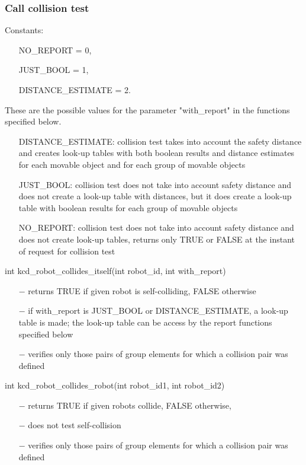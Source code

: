 \subsubsection{Call collision test}

Constants: 
\begin{itemize}
 \item[]NO\_REPORT = 0, 
 \item[]JUST\_BOOL = 1, 
 \item[]DISTANCE\_ESTIMATE = 2.
\end{itemize}
These are the possible values for the parameter "with\_report" in the
functions specified below.
\begin{itemize}
 \item[]DISTANCE\_ESTIMATE: collision test takes into account the safety distance
 and creates look-up tables with both boolean results and distance estimates
 for each movable object and for each group of movable objects
 \item[]JUST\_BOOL: collision test does not take into account safety distance
 and does not create a look-up table with distances, but it does create 
 a look-up table with boolean results for each group of movable objects
 \item[]NO\_REPORT: collision test does not take into account safety distance
 and does not create look-up tables, returns only TRUE or FALSE at the
 instant of request for collision test
\end{itemize}
int kcd\_robot\_collides\_itself(int robot\_id, int with\_report)
\begin{itemize}
\item[$-$] returns TRUE if given robot is self-colliding, FALSE otherwise
\item[$-$] if with\_report is JUST\_BOOL or DISTANCE\_ESTIMATE, a look-up 
  table is made; the look-up table can be access by the report 
  functions specified below
\item[$-$] verifies only those pairs of group elements for which a 
  collision pair was defined
\end{itemize}
int kcd\_robot\_collides\_robot(int robot\_id1, int robot\_id2)
\begin{itemize}
\item[$-$] returns TRUE if given robots collide, FALSE otherwise,
\item[$-$] does not test self-collision
\item[$-$] verifies only those pairs of group elements for which a 
  collision pair was defined
\end{itemize}
